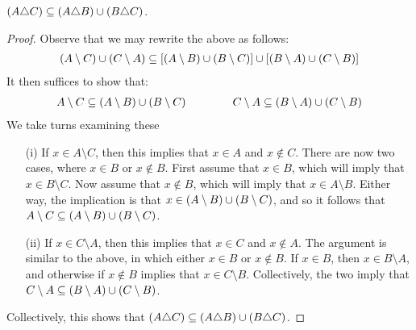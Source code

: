 \documentclass[12pt]{article}
\begin{document}
\begin{lemma}
  \(\left(A \triangle C\right)
          \subseteq \left(A \triangle B\right) \cup \left(B \triangle C\right)\).
\end{lemma}
\begin{proof}
  Observe that we may rewrite the above as follows:
  \begin{align*}
    \left(A \setminus C\right) \cup \left(C \setminus A\right)
      \subseteq
        \left[\left(A \setminus B\right) \cup \left(B \setminus C\right)\right] \cup
        \left[\left(B \setminus A\right) \cup \left(C \setminus B\right)\right]
  \end{align*}
  It then suffices to show that:
  \begin{align*}
    A \setminus C
      \subseteq \left(A \setminus B\right) \cup \left(B \setminus C\right)
    \qquad
    \qquad
    C \setminus A
      \subseteq \left(B \setminus A\right) \cup \left(C \setminus B\right)
  \end{align*}
  We take turns examining these
  \begin{enumerate}
    \item[(i)]
      If \(x \in A \setminus C\), then this implies that \(x \in A\)
      and \(x \not\in C\).
      There are now two cases, where \(x \in B\) or \(x \not\in B\).
      First assume that \(x \in B\), which will imply that
      \(x \in B \setminus C\).
      Now assume that \(x \not\in B\), which will imply that
      \(x \in A \setminus B\).
      Either way, the implication is that
      \(x \in \left(A \setminus B\right) \cup \left(B \setminus C\right)\),
      and so it follows that
      \(A \setminus C
      \subseteq \left(A \setminus B\right) \cup \left(B \setminus C\right)\).

    \item[(ii)]
      If \(x \in C \setminus A\), then this implies that
      \(x \in C\) and \(x \not\in A\).
      The argument is similar to the above, in which either
      \(x \in B\) or \(x \not\in B\).
      If \(x \in B\), then \(x \in B \setminus A\),
      and otherwise if \(x \not\in B\) implies that
      \(x \in C \setminus B\).
      Collectively, the two imply that
      \(C \setminus A \subseteq
        \left(B \setminus A\right) \cup \left(C \setminus B\right)\).
  \end{enumerate}
  Collectively, this shows that
  \(\left(A \triangle C\right)
          \subseteq \left(A \triangle B\right) \cup \left(B \triangle C\right)\).
\end{proof}
\end{document}
